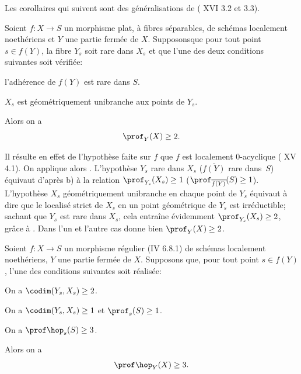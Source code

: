 Les corollaires qui suivent sont des g\'en\'eralisations de ( XVI 3.2 et 3.3).

\begin{corollaire} \label{XIV.1.19}
Soient $f:X\to S$ un morphisme plat, \`a fibres s\'eparables, de sch\'emas localement noeth\'eriens et $Y$ une partie ferm\'ee de $X$. Supposons\pageoriginale que pour tout point $s\in f(Y)$, la fibre $Y_s$ soit rare dans $X_s$ et que l'une des deux conditions suivantes soit v\'erifi\'ee:
\begin{enumeratea}
\item
l'adh\'erence de $f(Y)$ est rare dans $S$.
\item
$X_s$ est g\'eom\'etriquement unibranche aux points de $Y_s$.
\par\noindent
Alors on a
$$
\prof_Y(X)\geq 2.
$$
\end{enumeratea}
\end{corollaire}

Il r\'esulte en effet de l'hypoth\`ese faite sur $f$ que $f$ est localement $0$-acyclique ( XV 4.1). On applique alors . L'hypoth\`ese $Y_s$ rare dans $X_s$ (\resp $\overline{f(Y)}$ rare dans~$S$) \'equivaut d'apr\`es  b) \`a la relation $\prof_{Y_s}(X_s)\geq 1$ (\resp $\prof_{\overline{f(Y)}}(S)\geq 1$). L'hypoth\`ese $X_s$ g\'eom\'etriquement unibranche en chaque point de $Y_s$ \'equivaut \`a dire que le localis\'e strict de $X_s$ en un point g\'eom\'etrique de $Y_s$ est irr\'eductible; sachant que $Y_s$ est rare dans $X_s$, cela entra\^ine \'evidemment $\prof_{Y_s}(X_s)\geq 2$, gr\^ace \`a . Dans l'un et l'autre cas  donne bien $\prof_Y(X)\geq 2$.

\begin{corollaire} \label{XIV.1.20}
Soient $f:X\to S$ un morphisme r\'egulier (\textup{\EGA IV 6.8.1}) de sch\'emas localement noeth\'eriens, $Y$ une partie ferm\'ee de $X$. Supposons que, pour tout point $s\in f(Y)$, l'une des conditions suivantes soit r\'ealis\'ee:
\begin{enumeratea}
\item
On a $\codim(Y_s, X_s)\geq 2$.
\item
On a $\codim(Y_s, X_s)\geq 1$ et $\prof_s(S)\geq 1$.
\item
On a $\prof\hop_s(S)\geq 3$.
\end{enumeratea}
\noindent
Alors on a\pageoriginale
$$
\prof\hop_Y(X)\geq 3.
$$
\end{corollaire}

